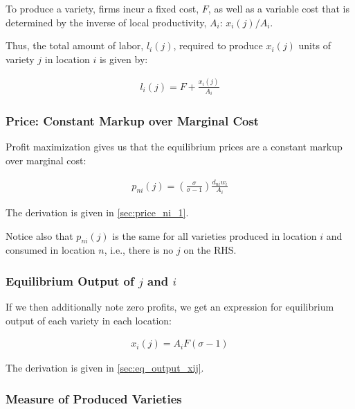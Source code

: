 \documentclass[10pt]{article}
\begin{document}
To produce a variety, firms incur 
a fixed cost, $F$, as well as a 
variable cost
that is determined by the inverse 
of local productivity, $A_i$: $x_i(j)/A_i$.

Thus, the total amount of labor, $l_i(j)$, required to produce
$x_i(j)$ units of variety $j$ in location $i$ is
given by:

\begin{align}
    l_i(j)=F+ \frac{x_i(j)}{A_i} \label{eq:labor_requirement}
\end{align}

\subsubsection{Price: Constant Markup over Marginal Cost}

Profit maximization  
gives us that 
the equilibrium prices are a 
constant markup over marginal cost:

\begin{align}
    p_{n i}(j)=\left(\frac{\sigma}{\sigma-1}\right) \frac{d_{n i} w_i}{A_i} \label{eq:price_ni_1}
\end{align}

The derivation is given in \autoref{sec:price_ni_1}.

Notice also that $p_{n i}(j)$ is the 
same for all varieties produced in location $i$ and 
consumed in location $n$, i.e.,
there is no $j$ on the RHS. 


\subsubsection{Equilibrium Output of $j$ and $i$}

If we then additionally note zero profits, we get
an expression for equilibrium output of each variety
in each location:

\begin{align}
    x_i(j)=A_i F(\sigma-1) \label{eq:eq_output_xij}
\end{align}

The derivation is given in \autoref{sec:eq_output_xij}.

\subsubsection{Measure of Produced Varieties}
\end{document}
